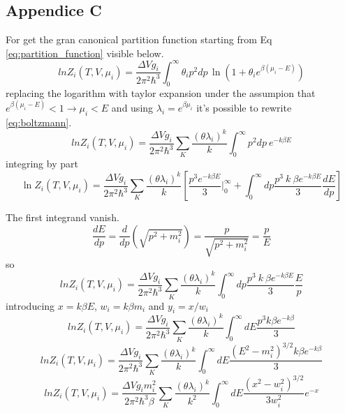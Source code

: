 \documentclass[12pt,a4paper]{book}
\begin{document}
	\subsection{Appendice C}
	For get the gran canonical partition function starting from Eq \ref{eq:partition_function} visible below.
	\begin{equation}
		ln Z_i(T,V,\mu_i)= \frac{\Delta V g_i}{2\pi^2\hbar^3} \int_{0}^{\infty} \theta_i p^2 dp \,  \ln(1+\theta_i e^{\beta(\mu_i-E)})
	\end{equation}
	replacing the logarithm with taylor expansion under the assumpion that $e^{\beta(\mu_i-E)} < 1 \rightarrow \mu_i < E$ and using $\lambda_i= e^{\beta \mu_i}$ it's possible to rewrite \ref{eq:boltzmann}.
	\begin{equation}
		ln Z_i(T,V,\mu_i)= \frac{\Delta V g_i}{2\pi^2\hbar^3} \sum_{K} \frac{(\theta \lambda_i)^k}{k} \int_{0}^{\infty} p^2 dp \  e^{-k \beta E}
	\end{equation}
	integring by part
	\begin{equation}
		\ln Z_i(T,V,\mu_i) = \frac{\Delta V g_i}{2\pi^2\hbar^3} \sum_{K} \frac{(\theta \lambda_i)^k}{k} \left[\frac{p^3 e^{-k \beta E}}{3} \Big|_0^\infty + \int_{0}^{\infty} dp \frac{p^3 \  k \  \beta e^{-k \beta E}}{3} \frac{dE}{dp} \right]
	\end{equation}
	
	The first integrand vanish.
	\begin{equation}
		\frac{dE}{dp} = \frac{d}{dp} (\sqrt{p^2+m_i^2}) = \frac{p}{\sqrt{p^2+m_i^2}} = \frac{p}{E}
	\end{equation}
	so
	\begin{equation}
		ln Z_i(T,V,\mu_i)= \frac{\Delta V g_i}{2\pi^2\hbar^3} \sum_{K} \frac{(\theta \lambda_i)^k}{k}  \int_{0}^{\infty} dp \frac{p^3 \  k \  \beta e^{-k \beta E}}{3} \frac{E}{p} 
	\end{equation}
	introducing $x= k\beta E$, $w_i=k\beta m_i$ and $y_i=x/w_i$
	\begin{equation}
		ln Z_i(T,V,\mu_i)= \frac{\Delta V g_i}{2\pi^2\hbar^3} \sum_{K} \frac{(\theta \lambda_i)^k}{k}  \int_{0}^{\infty} dE \frac{p^3 k \beta e^{-k \beta}}{3} 
	\end{equation}
	\begin{equation}
		ln Z_i(T,V,\mu_i)= \frac{\Delta V g_i}{2\pi^2\hbar^3} \sum_{K} \frac{(\theta \lambda_i)^k}{k}  \int_{0}^{\infty} dE \frac{(E^2-m_i^2)^{3/2} k \beta e^{-k \beta}}{3} 
	\end{equation}
	\begin{equation}
		ln Z_i(T,V,\mu_i)= \frac{\Delta V g_i m_i^2}{2\pi^2\hbar^3 \beta} \sum_{K} \frac{(\theta \lambda_i)^k}{k^2}  \int_{0}^{\infty} dE \frac{(x^2-w_i^2)^{3/2}}{3 w_i^2} e^{-x} 
	\end{equation}
	
\end{document}
